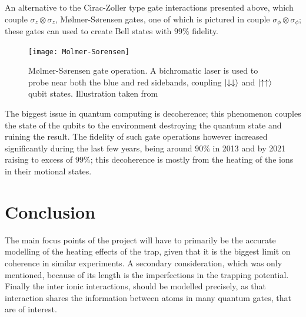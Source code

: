 \documentclass[12pt,twoside]{article}
\begin{document}
An alternative to the Cirac-Zoller type gate interactions presented above, which couple $\sigma_z\otimes\sigma_z$, M\o{}lmer-S\o{}rensen gates, one of which is pictured in \cite{Trapped_ion_qbit_toolbox} couple $\sigma_\phi\otimes\sigma_\phi$; these gates can used to create Bell states with $99\%$ fidelity.

\begin{figure}[t!]
	\centering
	\texttt{[image: Molmer-Sorensen]}
	\caption[M\o{}lmer-S\o{}rensen gate]{M\o{}lmer-S\o{}rensen gate operation. A bichromatic laser is used to probe near both the blue and red sidebands, coupling $\ket{\downarrow\downarrow}$ and $\ket{\uparrow\uparrow}$ qubit states. Illustration taken from \cite{Trapped_ion_qbit_toolbox}}
	\label{Fig:MolmerSorensen}
\end{figure}

The biggest issue in quantum computing is decoherence; this phenomenon couples the state of the qubits to the environment destroying the quantum state and ruining the result\cite{QI_Application}. The fidelity of such gate operations however increased significantly during the last few years, being around $90\%$ in 2013\cite{Trapped_ion_qbit_toolbox} and by 2021 raising to excess of $99\%$\cite{Trapped_Quantum_Computer}; this decoherence is mostly from the heating of the ions in their motional states\cite{Trapped_Quantum_Computer}.

\section{Conclusion}
\label{Conclusion}

The main focus points of the project will have to primarily be the accurate modelling of the heating effects of the trap, given that it is the biggest limit on coherence in similar experiments\cite{Trapped_Quantum_Computer}. A secondary consideration, which was only mentioned, because of its length is the imperfections in the trapping potential\cite{Charged_Particle_traps_Penning,Charged_Particle_traps_Paul}. Finally the inter ionic interactions, should be modelled precisely, as that interaction shares the information between atoms in many quantum gates, that are of interest\cite{Trapped_ion_qbit_toolbox}.
 



\end{document}
